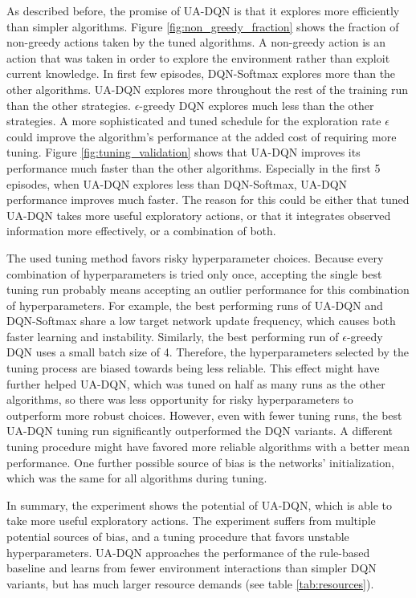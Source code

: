 As described before, the promise of UA-DQN is that it explores more efficiently than simpler algorithms.
Figure \ref{fig:non_greedy_fraction} shows the fraction of non-greedy actions taken by the tuned algorithms.
A non-greedy action is an action that was taken in order to explore the environment rather than exploit current knowledge.
In first few episodes, DQN-Softmax explores more than the other algorithms.
UA-DQN explores more throughout the rest of the training run than the other strategies.
$\epsilon$-greedy DQN explores much less than the other strategies.
A more sophisticated and tuned schedule for the exploration rate $\epsilon$ could improve the algorithm's performance at the added cost of requiring more tuning.
Figure \ref{fig:tuning_validation} shows that UA-DQN improves its performance much faster than the other algorithms.
Especially in the first 5 episodes, when UA-DQN explores less than DQN-Softmax, UA-DQN performance improves much faster.
The reason for this could be either that tuned UA-DQN takes more useful exploratory actions, or that it integrates observed information more effectively, or a combination of both.

The used tuning method favors risky hyperparameter choices.
Because every combination of hyperparameters is tried only once, accepting the single best tuning run probably means accepting an outlier performance for this combination of hyperparameters.
For example, the best performing runs of UA-DQN and DQN-Softmax share a low target network update frequency, which causes both faster learning and instability. Similarly, the best performing run of $\epsilon$-greedy DQN uses a small batch size of 4.
Therefore, the hyperparameters selected by the tuning process are biased towards being less reliable.
This effect might have further helped UA-DQN, which was tuned on half as many runs as the other algorithms, so there was less opportunity for risky hyperparameters to outperform more robust choices.
However, even with fewer tuning runs, the best UA-DQN tuning run significantly outperformed the DQN variants.
A different tuning procedure might have favored more reliable algorithms with a better mean performance.
One further possible source of bias is the networks' initialization, which was the same for all algorithms during tuning.

In summary, the experiment shows the potential of UA-DQN, which is able to take more useful exploratory actions.
The experiment suffers from multiple potential sources of bias, and a tuning procedure that favors unstable hyperparameters.
UA-DQN approaches the performance of the rule-based baseline and learns from fewer environment interactions than simpler DQN variants, but has much larger resource demands (see table \ref{tab:resources}).


